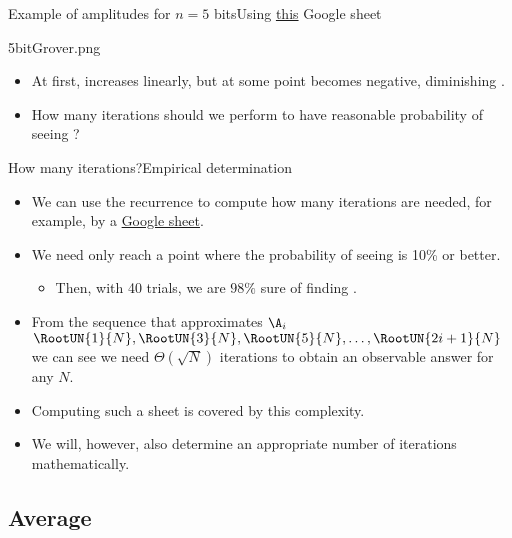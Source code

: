 \begin{Grover}
\begin{frame}{Example of amplitudes for $n=5$ bits}{Using \href{https://docs.google.com/spreadsheets/d/1JCp9PKLTQ7q9jdvRwj-gXxL9jYvu1O-1wA2OnnEBB3s/edit?usp=sharing}{this} Google sheet}

\Vskip{-4em}\begin{center}
\begin{Pixture}[width=0.5\textwidth]{27}{5bitGrover.png}
\end{Pixture}
\end{center}
\begin{itemize}
    \item At first, \A{} increases linearly, but at some point \B{} becomes negative, diminishing \A{}.
    \item How many iterations should we perform to have reasonable probability of seeing \W?
\end{itemize}
    
\end{frame}


\begin{frame}{How many iterations?}{Empirical determination}

\begin{itemize}
    \item We can use the recurrence to compute how many iterations are needed, for example, by a \href{https://docs.google.com/spreadsheets/d/1JCp9PKLTQ7q9jdvRwj-gXxL9jYvu1O-1wA2OnnEBB3s/edit?usp=sharing}{Google sheet}.
    \item We need only reach a point where the probability of seeing \W{} is 10\% or better.
   \begin{itemize}\item Then, with 40 trials, we are $98\%$ sure of finding \W.\end{itemize}
     \item From the sequence that approximates $\A_{i}$
    \(\RootUN{1}{N}, \RootUN{3}{N}, \RootUN{5}{N},\ldots, \RootUN{2i+1}{N}\)
    we can see we need $\Theta(\sqrt{N})$ iterations to obtain an observable answer for any $N$.
       \item Computing such a sheet is covered by this complexity.
    \item We will, however, also determine an appropriate number of iterations mathematically.
\end{itemize}
    
\end{frame}

\subsection*{Average}


\end{Grover}
